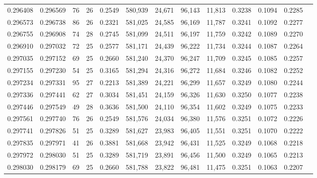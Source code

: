 \begin{tabular}{rrrrrrrrrrrrr}
0.296408 & 0.296569 &  76 &  26 &                                     0.2549 & 580,939 &  24,671 &  96,143 &  11,813 & 0.3238 & 0.1094 & 0.2285 \\
0.296573 & 0.296738 &  86 &  26 &                                     0.2321 & 581,025 &  24,585 &  96,169 &  11,787 & 0.3241 & 0.1092 & 0.2277 \\
0.296755 & 0.296908 &  74 &  28 &                                     0.2745 & 581,099 &  24,511 &  96,197 &  11,759 & 0.3242 & 0.1089 & 0.2270 \\
0.296910 & 0.297032 &  72 &  25 &                                     0.2577 & 581,171 &  24,439 &  96,222 &  11,734 & 0.3244 & 0.1087 & 0.2264 \\
0.297035 & 0.297152 &  69 &  25 &                                     0.2660 & 581,240 &  24,370 &  96,247 &  11,709 & 0.3245 & 0.1085 & 0.2257 \\
0.297155 & 0.297230 &  54 &  25 &                                     0.3165 & 581,294 &  24,316 &  96,272 &  11,684 & 0.3246 & 0.1082 & 0.2252 \\
0.297234 & 0.297331 &  95 &  27 &                                     0.2213 & 581,389 &  24,221 &  96,299 &  11,657 & 0.3249 & 0.1080 & 0.2244 \\
0.297336 & 0.297441 &  62 &  27 &                                     0.3034 & 581,451 &  24,159 &  96,326 &  11,630 & 0.3250 & 0.1077 & 0.2238 \\
0.297446 & 0.297549 &  49 &  28 &                                     0.3636 & 581,500 &  24,110 &  96,354 &  11,602 & 0.3249 & 0.1075 & 0.2233 \\
0.297561 & 0.297740 &  76 &  26 &                                     0.2549 & 581,576 &  24,034 &  96,380 &  11,576 & 0.3251 & 0.1072 & 0.2226 \\
0.297741 & 0.297826 &  51 &  25 &                                     0.3289 & 581,627 &  23,983 &  96,405 &  11,551 & 0.3251 & 0.1070 & 0.2222 \\
0.297835 & 0.297971 &  41 &  26 &                                     0.3881 & 581,668 &  23,942 &  96,431 &  11,525 & 0.3249 & 0.1068 & 0.2218 \\
0.297972 & 0.298030 &  51 &  25 &                                     0.3289 & 581,719 &  23,891 &  96,456 &  11,500 & 0.3249 & 0.1065 & 0.2213 \\
0.298030 & 0.298179 &  69 &  25 &                                     0.2660 & 581,788 &  23,822 &  96,481 &  11,475 & 0.3251 & 0.1063 & 0.2207 \\

\end{tabular}
